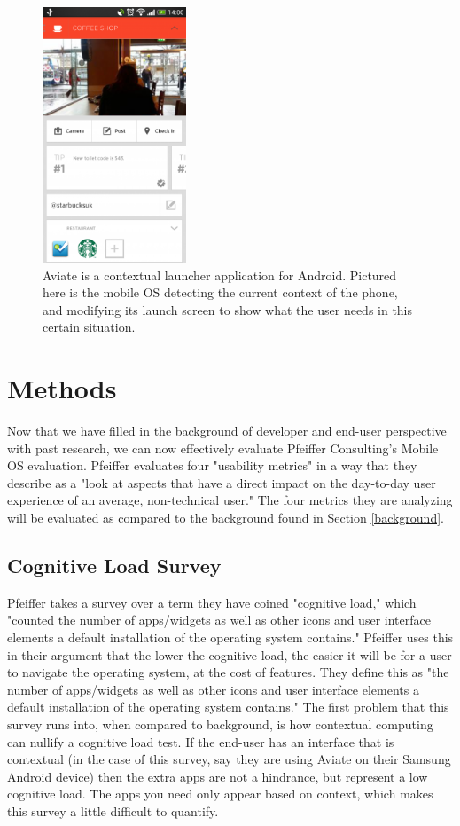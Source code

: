 \documentclass[11pt]{article}
\begin{document}
\begin{figure}[h]
\begin{center}
\includegraphics[height = 3in]{aviate}
\caption{Aviate is a contextual launcher application for Android. Pictured here is the mobile OS detecting the current context of the phone, and modifying its launch screen to show what the user needs in this certain situation. \cite{Aviate}}
\label{aviate}
\end{center}
\end{figure}


\section{Methods}
Now that we have filled in the background of developer and end-user perspective with past research, we can now effectively evaluate Pfeiffer Consulting's Mobile OS evaluation. Pfeiffer evaluates four "usability metrics" in a way that they describe as a "look at aspects that have a direct impact on the day-to-day user experience of an average, non-technical user." \cite{Pfeiffer} The four metrics they are analyzing will be evaluated as compared to the background found in Section \ref{background}.
\subsection{Cognitive Load Survey}
Pfeiffer takes a survey over a term they have coined "cognitive load," which "counted
the number of apps/widgets as well as other icons and user interface elements a default installation of the operating system contains." \cite{Pfeiffer} Pfeiffer uses this in their argument that the lower the cognitive load, the easier it will be for a user to navigate the operating system, at the cost of features. They define this as "the number of apps/widgets as well as other icons and user interface elements a default installation of the operating system contains." \cite{Pfeiffer} The first problem that this survey runs into, when compared to background, is how contextual computing can nullify a cognitive load test. If the end-user has an interface that is contextual (in the case of this survey, say they are using Aviate on their Samsung Android device) then the extra apps are not a hindrance, but represent a low cognitive load. The apps you need only appear based on context, which makes this survey a little difficult to quantify.
\end{document}
